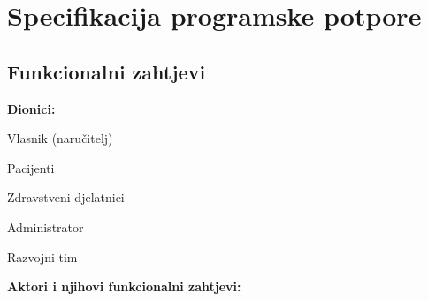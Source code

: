 \chapter{Specifikacija programske potpore}

\section{Funkcionalni zahtjevi}

\noindent \textbf{Dionici:}

\begin{packed_enum}
	
	\item Vlasnik (naručitelj)
	\item Pacijenti
	\item Zdravstveni djelatnici			
	\item Administrator
	\item Razvojni tim
	
\end{packed_enum}


\noindent \textbf{Aktori i njihovi funkcionalni zahtjevi:}


